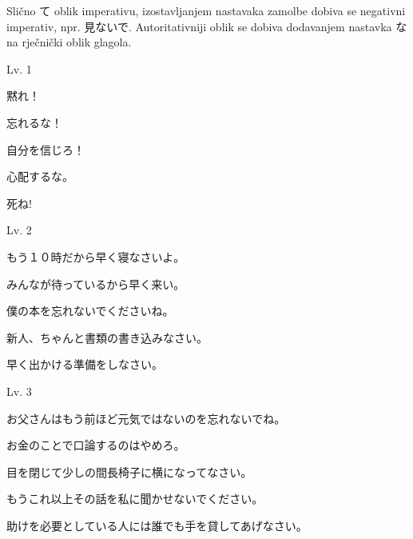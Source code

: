 	Slično て oblik imperativu, izostavljanjem nastavaka zamolbe dobiva se negativni imperativ, npr. 見ないで. Autoritativniji oblik se dobiva dodavanjem nastavka な na rječnički oblik glagola.
	
	\begin{reibun}
	\end{reibun}
	 
	\newpage		

	\begin{mondai}{Lv. 1}
		\item 黙れ！
		\item 忘れるな！
		\item 自分を信じろ！
		\item 心配するな。
		\item 死ね!
	\end{mondai}

	\begin{mondai}{Lv. 2}
		\item もう１０時だから早く寝なさいよ。
		\item みんなが待っているから早く来い。
		\item 僕の本を忘れないでくださいね。
		\item 新人、ちゃんと書類の書き込みなさい。
		\item 早く出かける準備をしなさい。
	\end{mondai}

	\begin{mondai}{Lv. 3}
		\item お父さんはもう前ほど元気ではないのを忘れないでね。
		\item お金のことで口論するのはやめろ。
		\item 目を閉じて少しの間長椅子に横になってなさい。
		\item もうこれ以上その話を私に聞かせないでください。
		\item 助けを必要としている人には誰でも手を貸してあげなさい。
	\end{mondai}

